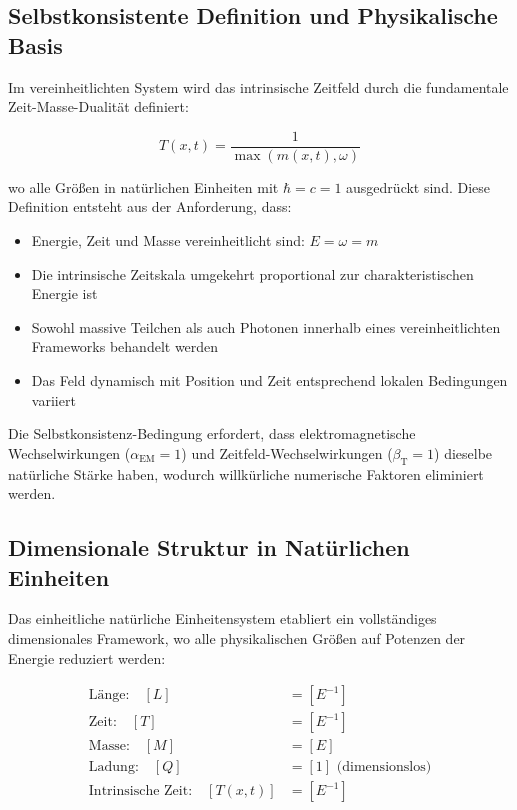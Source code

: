 \documentclass[12pt,a4paper]{article}
\newcommand{\Tfieldt}{T(x,t)}
\newcommand{\alphaEM}{\alpha_{\text{EM}}}
\newcommand{\betaT}{\beta_{\text{T}}}
\begin{document}
	\subsection{Selbstkonsistente Definition und Physikalische Basis}
	\label{subsec:self_consistent_definition}
	
	Im vereinheitlichten System wird das intrinsische Zeitfeld durch die fundamentale Zeit-Masse-Dualität definiert:
	
	\begin{equation}
		\Tfieldt = \frac{1}{\max(m(x,t), \omega)}
	\end{equation}
	
	wo alle Größen in natürlichen Einheiten mit $\hbar = c = 1$ ausgedrückt sind. Diese Definition entsteht aus der Anforderung, dass:
	
	\begin{itemize}
		\item Energie, Zeit und Masse vereinheitlicht sind: $E = \omega = m$
		\item Die intrinsische Zeitskala umgekehrt proportional zur charakteristischen Energie ist
		\item Sowohl massive Teilchen als auch Photonen innerhalb eines vereinheitlichten Frameworks behandelt werden
		\item Das Feld dynamisch mit Position und Zeit entsprechend lokalen Bedingungen variiert
	\end{itemize}
	
	Die Selbstkonsistenz-Bedingung erfordert, dass elektromagnetische Wechselwirkungen ($\alphaEM = 1$) und Zeitfeld-Wechselwirkungen ($\betaT = 1$) dieselbe natürliche Stärke haben, wodurch willkürliche numerische Faktoren eliminiert werden.
	
	\subsection{Dimensionale Struktur in Natürlichen Einheiten}
	\label{subsec:dimensional_structure}
	
	Das einheitliche natürliche Einheitensystem etabliert ein vollständiges dimensionales Framework, wo alle physikalischen Größen auf Potenzen der Energie reduziert werden:
	
	\begin{tcolorbox}[colback=blue!5!white,colframe=blue!75!black,title=Dimensionale Struktur Einheitlicher Natürlicher Einheiten]
		\begin{align}
			\text{Länge:} \quad [L] &= [E^{-1}] \nonumber\\
			\text{Zeit:} \quad [T] &= [E^{-1}] \nonumber\\
			\text{Masse:} \quad [M] &= [E] \nonumber\\
			\text{Ladung:} \quad [Q] &= [1] \text{ (dimensionslos)} \nonumber\\
			\text{Intrinsische Zeit:} \quad [\Tfieldt] &= [E^{-1}] \nonumber
		\end{align}
	\end{tcolorbox}
	
\end{document}
